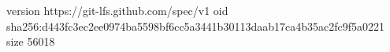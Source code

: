 version https://git-lfs.github.com/spec/v1
oid sha256:d443fc3ec2ee0974ba5598bf6cc5a3441b30113daab17ca4b35ac2fc9f5a0221
size 56018

